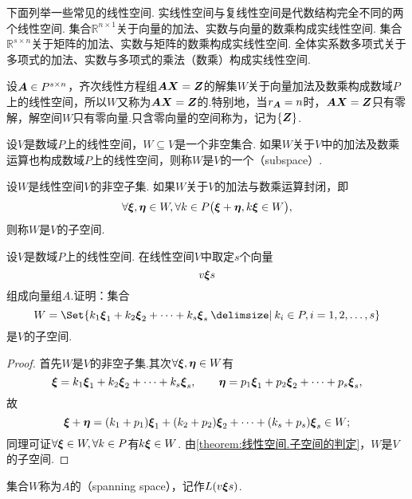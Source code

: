 \begin{example}
下面列举一些常见的线性空间.
实线性空间与复线性空间是代数结构完全不同的两个线性空间.
集合\(\mathbb{R}^{n \times 1}\)关于向量的加法、实数与向量的数乘构成实线性空间.
集合\(\mathbb{R}^{s \times n}\)关于矩阵的加法、实数与矩阵的数乘构成实线性空间.
全体实系数多项式关于多项式的加法、实数与多项式的乘法（数乘）构成实线性空间.
\end{example}

\begin{example}
设\(\boldsymbol{A} \in P^{s \times n}\)，齐次线性方程组\(\boldsymbol{A}\boldsymbol{X}=\boldsymbol{Z}\)的解集\(W\)关于向量加法及数乘构成数域\(P\)上的线性空间，所以\(W\)又称为\(\boldsymbol{A}\boldsymbol{X}=\boldsymbol{Z}\)的.特别地，当\(r_{\boldsymbol{A}}=n\)时，\(\boldsymbol{A}\boldsymbol{X}=\boldsymbol{Z}\)只有零解，解空间\(W\)只有零向量.只含零向量的空间称为，记为\(\{\boldsymbol{Z}\}\).
\end{example}

\begin{definition}
设\(V\)是数域\(P\)上的线性空间，\(W \subseteq V\)是一个非空集合.
如果\(W\)关于\(V\)中的加法及数乘运算也构成数域\(P\)上的线性空间，则称\(W\)是\(V\)的一个（subspace）.
\end{definition}

\begin{theorem}\label{theorem:线性空间.子空间的判定}
设\(W\)是线性空间\(V\)的非空子集.
如果\(W\)关于\(V\)的加法与数乘运算封闭，即\[
\forall \boldsymbol{\xi},\boldsymbol{\eta} \in W,
\forall k \in P
\bigl(
\boldsymbol{\xi}+\boldsymbol{\eta}, k \boldsymbol{\xi} \in W
\bigr),
\]则称\(W\)是\(V\)的子空间.
\end{theorem}

\begin{example}
设\(V\)是数域\(P\)上的线性空间.
在线性空间\(V\)中取定\(s\)个向量\[
v{\boldsymbol{\xi}}{s}
\]组成向量组\(A\).证明：集合\[
W = \Set{ k_1 \a_1 + k_2 \a_2 + \dotsb + k_s \a_s \given k_i \in P, i=1,2,\dotsc,s }
\]是\(V\)的子空间.
\begin{proof}
首先\(W\)是\(V\)的非空子集.其次\(\forall \boldsymbol{\xi},\boldsymbol{\eta} \in W\)有\[
\boldsymbol{\xi} = k_1 \boldsymbol{\xi}_1 + k_2 \boldsymbol{\xi}_2 + \dotsb + k_s \boldsymbol{\xi}_s,
\qquad
\boldsymbol{\eta} = p_1 \boldsymbol{\xi}_1 + p_2 \boldsymbol{\xi}_2 + \dotsb + p_s \boldsymbol{\xi}_s,
\]故\[
\boldsymbol{\xi}+\boldsymbol{\eta} = (k_1+p_1)\boldsymbol{\xi}_1 + (k_2+p_2)\boldsymbol{\xi}_2 + \dotsb + (k_s+p_s)\boldsymbol{\xi}_s \in W;
\]同理可证\(\forall \boldsymbol{\xi} \in W, \forall k \in P\)有\(k\boldsymbol{\xi} \in W\).
由\cref{theorem:线性空间.子空间的判定}，\(W\)是\(V\)的子空间.
\end{proof}
集合\(W\)称为\(A\)的（spanning space），记作\(L(v{\boldsymbol{\xi}}{s})\).
\end{example}

